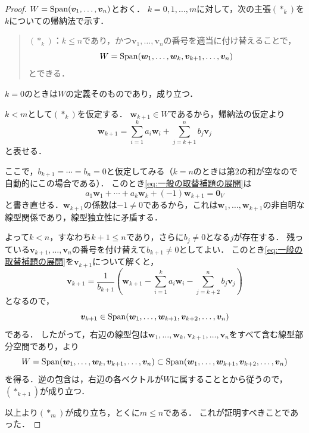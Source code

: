 \begin{tleftbar}
\begin{proof}
  $W = \operatorname{Span}(\bm{v}_1, \dots, \bm{v}_n)$とおく．
  $k = 0, 1, \dots, m$に対して，次の主張$(\ast_k)$を$k$についての帰納法で示す．

  \begin{quote}
    $(\ast_k)$：$k \le n$であり，かつ$\bm{v}_1, \dots, \bm{v}_n$の番号を適当に付け替えることで，
    \[
      W = \operatorname{Span}(\bm{w}_1, \dots, \bm{w}_k, \bm{v}_{k+1}, \dots, \bm{v}_n)
    \]
    とできる．
  \end{quote}

  $k = 0$のときは$W$の定義そのものであり，成り立つ．

  $k < m$として$(\ast_k)$を仮定する．
  $\bm{w}_{k+1} \in W$であるから，帰納法の仮定より
  \begin{equation}
    \bm{w}_{k+1}
    = \sum_{i=1}^{k} a_i \bm{w}_i + \sum_{j=k+1}^{n} b_j \bm{v}_j
    \label{eq:一般の取替補題の展開}
  \end{equation}
  と表せる．

  ここで，$b_{k+1} = \cdots = b_n = 0$と仮定してみる（$k = n$のときは第$2$の和が空なので自動的にこの場合である）．
  このとき\eqref{eq:一般の取替補題の展開}は
  \[
    a_1 \bm{w}_1 + \cdots + a_k \bm{w}_k + (-1)\bm{w}_{k+1} = \bm{0}_V
  \]
  と書き直せる．$\bm{w}_{k+1}$の係数は$-1 \ne 0$であるから，これは$\bm{w}_1, \dots, \bm{w}_{k+1}$の非自明な線型関係であり，線型独立性に矛盾する．

  よって$k < n$，すなわち$k + 1 \le n$であり，さらに$b_j \ne 0$となる$j$が存在する．
  残っている$\bm{v}_{k+1}, \dots, \bm{v}_n$の番号を付け替えて$b_{k+1} \ne 0$としてよい．
  このとき\eqref{eq:一般の取替補題の展開}を$\bm{v}_{k+1}$について解くと，
  \[
    \bm{v}_{k+1}
    = \frac{1}{b_{k+1}}\left( \bm{w}_{k+1} - \sum_{i=1}^{k} a_i \bm{w}_i - \sum_{j=k+2}^{n} b_j \bm{v}_j \right)
  \]
  となるので，
  \[
    \bm{v}_{k+1} \in \operatorname{Span}(\bm{w}_1, \dots, \bm{w}_{k+1}, \bm{v}_{k+2}, \dots, \bm{v}_n)
  \]
  である．
  したがって，右辺の線型包は$\bm{w}_1, \dots, \bm{w}_k, \bm{v}_{k+1}, \dots, \bm{v}_n$をすべて含む線型部分空間であり，より
  \[
    W = \operatorname{Span}(\bm{w}_1, \dots, \bm{w}_k, \bm{v}_{k+1}, \dots, \bm{v}_n)
    \subset \operatorname{Span}(\bm{w}_1, \dots, \bm{w}_{k+1}, \bm{v}_{k+2}, \dots, \bm{v}_n)
  \]
  を得る．逆の包含は，右辺の各ベクトルが$W$に属することとから従うので，$(\ast_{k+1})$が成り立つ．

  以上より$(\ast_m)$が成り立ち，とくに$m \le n$である．
  これが証明すべきことであった．
\end{proof}
\end{tleftbar}

